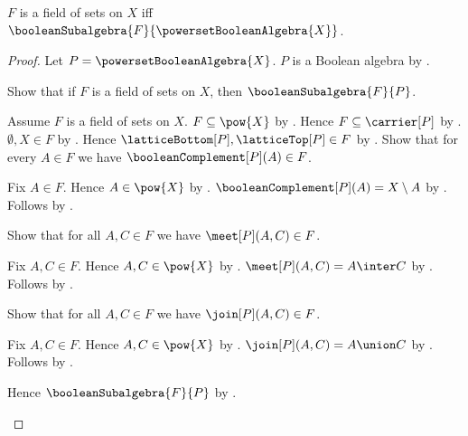 \begin{theorem}\label{field_of_sets_iff_boolean_subalgebra_of_powerset}
    $F$ is a field of sets on $X$ iff
        $\booleanSubalgebra{F}{\powersetBooleanAlgebra{X}}$.
\end{theorem}
\begin{proof}
    Let $P=\powersetBooleanAlgebra{X}$.
    $P$ is a Boolean algebra by
        .

    Show that if $F$ is a field of sets on $X$, then
        $\booleanSubalgebra{F}{P}$.
    \begin{subproof}
        Assume $F$ is a field of sets on $X$.
        $F\subseteq\pow{X}$ by .
        Hence $F\subseteq\carrier[P]$ by
            .
        $\emptyset,X\in F$ by
            .
        Hence $\latticeBottom[P],\latticeTop[P]\in F$ by
            .
        Show that for every $A\in F$ we have
            $\booleanComplement[P](A)\in F$.
        \begin{subproof}
            Fix $A\in F$.
            Hence $A\in\pow{X}$ by .
            $\booleanComplement[P](A)=X\setminus A$ by
                .
            Follows by .
        \end{subproof}
        Show that for all $A,C\in F$ we have $\meet[P](A,C)\in F$.
        \begin{subproof}
            Fix $A,C\in F$.
            Hence $A,C\in\pow{X}$ by .
            $\meet[P](A,C)=A\inter C$ by
                .
            Follows by .
        \end{subproof}
        Show that for all $A,C\in F$ we have $\join[P](A,C)\in F$.
        \begin{subproof}
            Fix $A,C\in F$.
            Hence $A,C\in\pow{X}$ by .
            $\join[P](A,C)=A\union C$ by
                .
            Follows by .
        \end{subproof}
        Hence $\booleanSubalgebra{F}{P}$ by
            .
    \end{subproof}


\end{proof}
